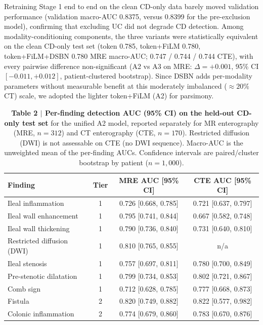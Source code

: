 \documentclass[11pt]{article}
\begin{document}
Retraining Stage 1 end to end on the clean CD-only data barely moved validation performance
(validation macro-AUC 0.8375, versus 0.8399 for the pre-exclusion model), confirming that excluding
UC did not degrade CD detection. Among modality-conditioning components, the three variants were statistically equivalent on the
clean CD-only test set (token 0.785, token+FiLM 0.780, token+FiLM+DSBN 0.780 MRE macro-AUC;
0.747 / 0.744 / 0.744 CTE), with every pairwise difference non-significant (A2 vs A3 on MRE:
$\Delta = +0.001$, 95\% CI $[-0.011, +0.012]$, patient-clustered bootstrap). Since DSBN adds
per-modality parameters without measurable benefit at this moderately imbalanced ($\approx 20\%$ CT)
scale, we adopted the lighter token+FiLM (A2) for parsimony.

\begin{table}[htbp]
\centering
\caption{\textbf{Table 2 $\vert$ Per-finding detection AUC (95\% CI) on the held-out CD-only test set}
for the unified A2 model, reported separately for MR enterography (MRE, $n=312$) and CT enterography
(CTE, $n=170$). Restricted diffusion (DWI) is not assessable on CTE (no DWI sequence). Macro-AUC is the
unweighted mean of the per-finding AUCs. Confidence intervals are paired/cluster bootstrap by patient
($n=1{,}000$).}
\label{tab:detection}
\small
\begin{tabular}{@{}lccc@{}}
\toprule
\textbf{Finding} & \textbf{Tier} & \textbf{MRE AUC [95\% CI]} & \textbf{CTE AUC [95\% CI]} \\
\midrule
Ileal inflammation          & 1 & 0.726 [0.668, 0.785] & 0.721 [0.637, 0.797] \\
Ileal wall enhancement      & 1 & 0.795 [0.741, 0.844] & 0.667 [0.582, 0.748] \\
Ileal wall thickening       & 1 & 0.790 [0.736, 0.840] & 0.731 [0.640, 0.810] \\
Restricted diffusion (DWI)  & 1 & 0.810 [0.765, 0.855] & n/a \\
Ileal stenosis              & 1 & 0.757 [0.697, 0.811] & 0.780 [0.700, 0.849] \\
Pre-stenotic dilatation     & 1 & 0.799 [0.734, 0.853] & 0.802 [0.721, 0.867] \\
Comb sign                   & 1 & 0.712 [0.628, 0.785] & 0.777 [0.668, 0.873] \\
Fistula                     & 2 & 0.820 [0.749, 0.882] & 0.822 [0.577, 0.982] \\
Colonic inflammation        & 2 & 0.774 [0.679, 0.860] & 0.783 [0.670, 0.876] \\

\end{tabular}
\end{table}
\end{document}
